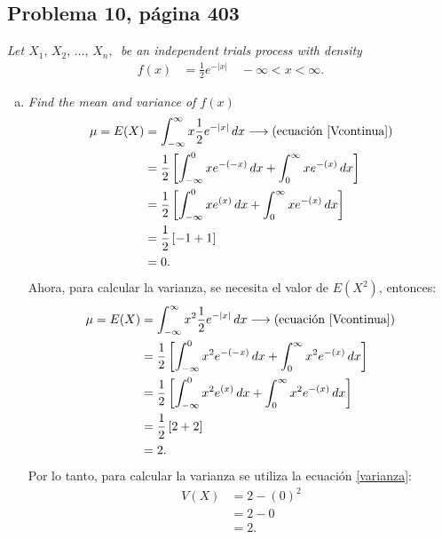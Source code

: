\documentclass{article}
\begin{document}
\subsection{Problema 10, página 403}
\noindent \textit{Let $X_{1}, \, X_{2}, \, \dots, \, X_{n}, \,$ be an independent trials process with density}
\begin{align} 
\nonumber
        f{(x)} & = \frac{1}{2}e^{-|x|} \quad -\infty < x <  \infty.
\end{align}

\begin{enumerate}[a)]
    \item \textit{Find the mean and variance of $f(x)$}
    \begin{align}
    \nonumber
        \mu = E{(X)} & =  \int_{-\infty}^{\infty} x \frac{1}{2}e^{-|x|} \, dx \longrightarrow (\text{ecuación \ref{Vcontinua}}) \\ \nonumber
                    & = \frac{1}{2} \left[\int_{-\infty}^{0} x e^{-(-x)} \, dx + \int_{0}^{\infty}x e^{-(x)} \, dx \right] \\ \nonumber
                    & = \frac{1}{2} \left[\int_{-\infty}^{0} x e^{(x)} \, dx + \int_{0}^{\infty}x e^{-(x)} \, dx \right] \\ \nonumber
                    & = \frac{1}{2} \left[-1 + 1 \right] \\ \nonumber
                    & = 0. \nonumber
    \end{align}
Ahora, para calcular la varianza, se necesita el valor de $E(X^2)$, entonces:
    \begin{align}
    \nonumber
        \mu = E{(X)} & =  \int_{-\infty}^{\infty} x^2 \frac{1}{2}e^{-|x|} \, dx \longrightarrow (\text{ecuación \ref{Vcontinua}}) \\ \nonumber
                    & = \frac{1}{2} \left[\int_{-\infty}^{0} x^2 e^{-(-x)} \, dx + \int_{0}^{\infty} x^2 e^{-(x)} \, dx \right] \\ \nonumber
                    & = \frac{1}{2} \left[\int_{-\infty}^{0} x^2 e^{(x)} \, dx + \int_{0}^{\infty} x^2 e^{-(x)} \, dx \right] \\ \nonumber
                    & = \frac{1}{2} \left[2+2 \right] \\ \nonumber
                    & = 2. \nonumber
    \end{align}
Por lo tanto, para calcular la varianza se utiliza la ecuación \ref{varianza}:
    \begin{align}
        \nonumber
        V{(X)}  & = 2 - (0)^2 \\ \nonumber
                & = 2 - 0 \\ \nonumber
                & = 2. \nonumber
    \end{align}
    

\end{enumerate}
\end{document}
